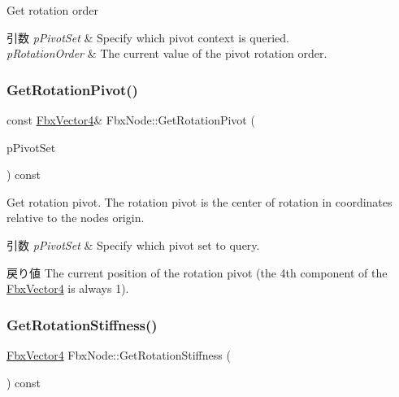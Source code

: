 Get rotation order 
\begin{DoxyParams}{引数}
{\em p\+Pivot\+Set} & Specify which pivot context is queried. \\
\hline
{\em p\+Rotation\+Order} & The current value of the pivot rotation order. \\
\hline
\end{DoxyParams}
\mbox{\label{class_fbx_node_ab0ca056f4773e45eeb10c8afe9d439bd}} 
\subsubsection{\texorpdfstring{Get\+Rotation\+Pivot()}{GetRotationPivot()}}
{\footnotesize\ttfamily const \hyperlink{class_fbx_vector4}{Fbx\+Vector4}\& Fbx\+Node\+::\+Get\+Rotation\+Pivot (\begin{DoxyParamCaption}\item[{\hyperlink{class_fbx_node_ae62b7311ac4727654cdf1ebd5cbf7343}{E\+Pivot\+Set}}]{p\+Pivot\+Set }\end{DoxyParamCaption}) const}

Get rotation pivot. The rotation pivot is the center of rotation in coordinates relative to the node\textquotesingle{}s origin. 
\begin{DoxyParams}{引数}
{\em p\+Pivot\+Set} & Specify which pivot set to query. \\
\hline
\end{DoxyParams}
\begin{DoxyReturn}{戻り値}
The current position of the rotation pivot (the 4th component of the \hyperlink{class_fbx_vector4}{Fbx\+Vector4} is always 1). 
\end{DoxyReturn}
\mbox{\label{class_fbx_node_a6bea622a74023ebdef08a44a045e6151}} 
\subsubsection{\texorpdfstring{Get\+Rotation\+Stiffness()}{GetRotationStiffness()}}
{\footnotesize\ttfamily \hyperlink{class_fbx_vector4}{Fbx\+Vector4} Fbx\+Node\+::\+Get\+Rotation\+Stiffness (\begin{DoxyParamCaption}{ }\end{DoxyParamCaption}) const}

